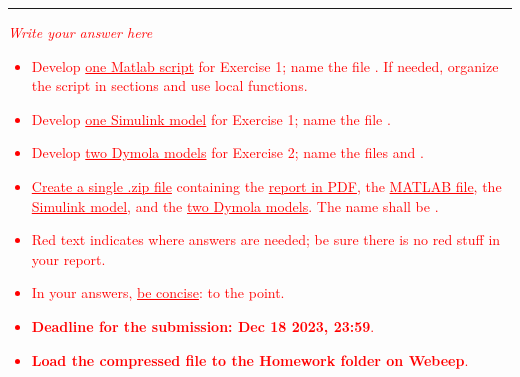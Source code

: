 \documentclass[11pt,a4paper,oneside]{article}
\newcommand{\tr}{\textcolor{red}}
\begin{document}
    
\medskip


\medskip \hrule \medskip
{}

\tr{\textit{Write your answer here}}



\clearpage

\tr{
\begin{itemize}
\item Develop \underline{one Matlab script} for Exercise 1; name the file . If needed, organize the script in sections and use local functions. 
\item Develop \underline{one Simulink model} for Exercise 1; name the file . 
\item Develop \underline{two Dymola models} for Exercise 2; name the files  and  . 
\item \underline{Create a single .zip file} containing the \underline{report in PDF}, the \underline{MATLAB file}, the \underline{Simulink model}, and the \underline{two Dymola models}. The name shall be .
\item Red text indicates where answers are needed; be sure there is no red stuff in your report.
\item In your answers, \underline{be concise}: to the point.
\item \textbf{Deadline for the submission: Dec 18 2023, 23:59}.
\item \textbf{Load the compressed file to the Homework folder on Webeep}.
\end{itemize}
}
\end{document}
